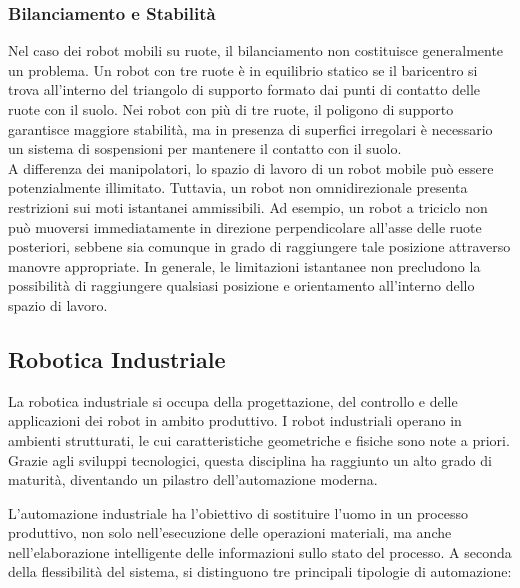 ﻿\documentclass[11pt, a4paper]{article}
\begin{document}

\subsubsection{Bilanciamento e Stabilità}
Nel caso dei robot mobili su ruote, il bilanciamento non costituisce generalmente un problema. Un robot con tre ruote è in equilibrio statico se il baricentro si trova all'interno del triangolo di supporto formato dai punti di contatto delle ruote con il suolo. Nei robot con più di tre ruote, il poligono di supporto garantisce maggiore stabilità, ma in presenza di superfici irregolari è necessario un sistema di sospensioni per mantenere il contatto con il suolo.\\
A differenza dei manipolatori, lo spazio di lavoro di un robot mobile può essere potenzialmente illimitato. Tuttavia, un robot non omnidirezionale presenta restrizioni sui moti istantanei ammissibili. Ad esempio, un robot a triciclo non può muoversi immediatamente in direzione perpendicolare all'asse delle ruote posteriori, sebbene sia comunque in grado di raggiungere tale posizione attraverso manovre appropriate. In generale, le limitazioni istantanee non precludono la possibilità di raggiungere qualsiasi posizione e orientamento all'interno dello spazio di lavoro.

\newpage
\subsection{Robotica Industriale}

La robotica industriale si occupa della progettazione, del controllo e delle applicazioni dei robot in ambito produttivo. I robot industriali operano in ambienti strutturati, le cui caratteristiche geometriche e fisiche sono note a priori. Grazie agli sviluppi tecnologici, questa disciplina ha raggiunto un alto grado di maturità, diventando un pilastro dell'automazione moderna.

L'automazione industriale ha l'obiettivo di sostituire l'uomo in un processo produttivo, non solo nell'esecuzione delle operazioni materiali, ma anche nell'elaborazione intelligente delle informazioni sullo stato del processo. A seconda della flessibilità del sistema, si distinguono tre principali tipologie di automazione:
\end{document}

